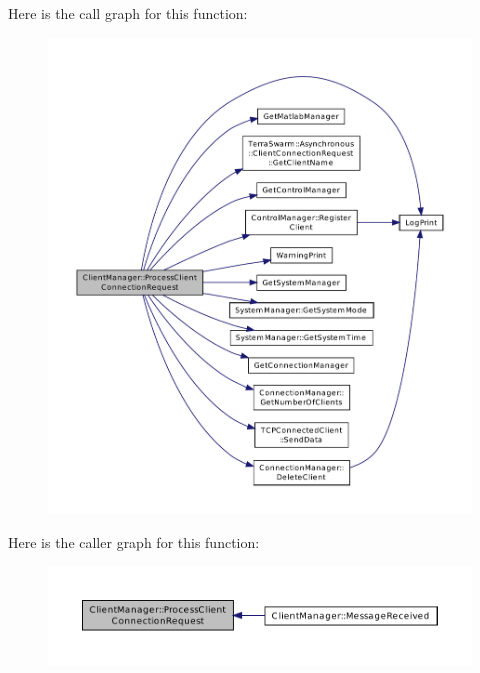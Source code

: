 Here is the call graph for this function\-:\nopagebreak
\begin{figure}[H]
\begin{center}
\leavevmode
\includegraphics[width=350pt]{class_client_manager_a6d544b4d20cd3b906b6a033c8d70e4a5_cgraph}
\end{center}
\end{figure}




Here is the caller graph for this function\-:\nopagebreak
\begin{figure}[H]
\begin{center}
\leavevmode
\includegraphics[width=350pt]{class_client_manager_a6d544b4d20cd3b906b6a033c8d70e4a5_icgraph}
\end{center}
\end{figure}


